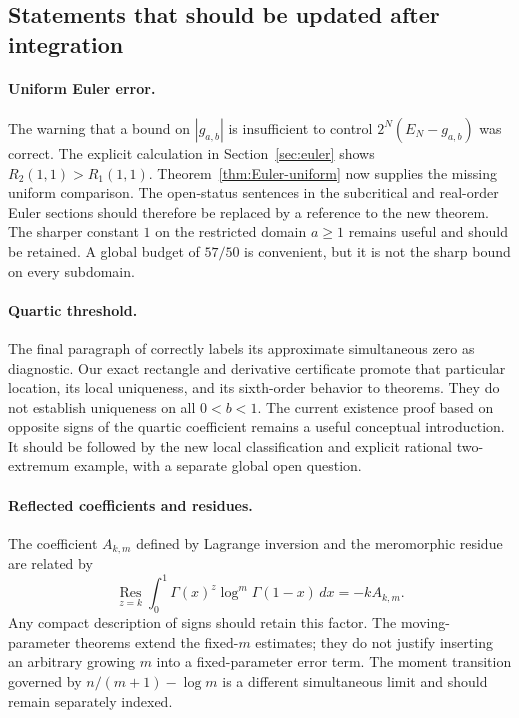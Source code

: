 \subsection{Statements that should be updated after integration}

\paragraph{Uniform Euler error.}
The warning that a bound on $|g_{a,b}|$ is insufficient to control
$2^N(E_N-g_{a,b})$ was correct. The explicit calculation in
Section~\ref{sec:euler} shows $R_2(1,1)>R_1(1,1)$.
Theorem~\ref{thm:Euler-uniform} now supplies the missing uniform
comparison. The open-status sentences in the subcritical and
real-order Euler sections should therefore be replaced by a
reference to the new theorem. The sharper constant $1$ on the
restricted domain $a\geq1$ remains useful and should be retained.
A global budget of $57/50$ is convenient, but it is not the sharp
bound on every subdomain.

\paragraph{Quartic threshold.}
The final paragraph of  correctly
labels its approximate simultaneous zero as diagnostic. Our exact
rectangle and derivative certificate promote that particular
location, its local uniqueness, and its sixth-order behavior to
theorems. They do not establish uniqueness on all $0<b<1$.
The current existence proof based on opposite signs of the quartic
coefficient remains a useful conceptual introduction. It should
be followed by the new local classification and explicit rational
two-extremum example, with a separate global open question.

\paragraph{Reflected coefficients and residues.}
The coefficient $A_{k,m}$ defined by Lagrange inversion and the
meromorphic residue are related by
\[
 \operatorname*{Res}_{z=k}
 \int_0^1\Gamma(x)^z\log^m\Gamma(1-x)\,dx=-kA_{k,m}.
\]
Any compact description of signs should retain this factor.
The moving-parameter theorems extend the fixed-$m$ estimates;
they do not justify inserting an arbitrary growing $m$ into a
fixed-parameter error term. The moment transition governed by
$n/(m+1)-\log m$ is a different simultaneous limit and should
remain separately indexed.

